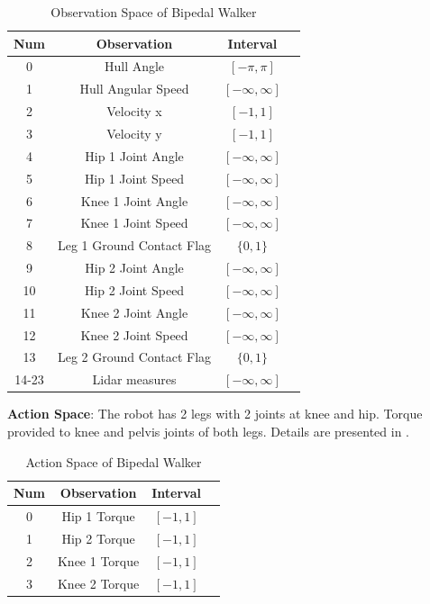 \begin{table}[h!]
	\begin{center}
	\begin{tabular}{cccc}
		\textbf{Num} & \textbf{Observation} & \textbf{Interval} \\
		\hline 
		0  & Hull Angle & $[-\pi,\pi]$ \\
		1  & Hull Angular Speed & $[-\infty,\infty]$ \\
		2  & Velocity x & $[-1,1]$ \\
		3  & Velocity y &$[-1,1]$ \\
		4  & Hip 1 Joint Angle & $[-\infty,\infty]$ \\
		5  & Hip 1 Joint Speed & $[-\infty,\infty]$ \\
		6  & Knee 1 Joint Angle & $[-\infty,\infty]$ \\
		7  & Knee 1 Joint Speed & $[-\infty,\infty]$ \\
		8  & Leg 1 Ground Contact Flag & $\{0,1\}$ \\
		9  & Hip 2 Joint Angle & $[-\infty,\infty]$ \\
		10  & Hip 2 Joint Speed & $[-\infty,\infty]$ \\
		11  & Knee 2 Joint Angle & $[-\infty,\infty]$ \\
		12  & Knee 2 Joint Speed & $[-\infty,\infty]$ \\
		13  & Leg 2 Ground Contact Flag & $\{0,1\}$ \\
		14-23  & Lidar measures  & $[-\infty,\infty]$
	\end{tabular}
	\end{center}
	\caption{Observation Space of Bipedal Walker}
	\label{table:bpw_obs_space}
\end{table}
\textbf{Action Space}: The robot has 2 legs with 2 joints at knee and hip. Torque provided to knee and pelvis joints of both legs. Details are presented in . \\
\begin{table}[h!]
	\begin{center}
		\begin{tabular}{cccc}
			\textbf{Num} & \textbf{Observation} & \textbf{Interval} \\
			\hline
			0  & Hip 1 Torque & $[-1,1]$ \\
			1  & Hip 2 Torque & $[-1,1]$ \\
			2  & Knee 1 Torque & $[-1,1]$ \\
			3  & Knee 2 Torque & $[-1,1]$ \\
		\end{tabular}
	\end{center}
	\caption{Action Space of Bipedal Walker}
	\label{table:bpw_act_space}
\end{table}
